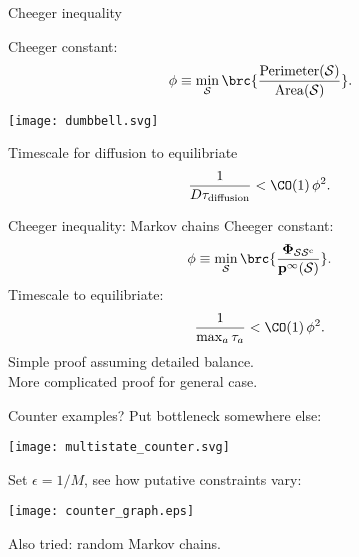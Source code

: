 \documentclass{beamer}%
\newcommand{\pr}{\mathbf{p}}
\newcommand{\eq}{\pr^\infty}
\newcommand{\F}{\boldsymbol{\Phi}}
\newcommand{\CS}{\mathcal{S}}
\newcommand{\comp}{^\mathrm{c}}
\begin{document}

\begin{frame}{Cheeger inequality}
%
 \parbox{5cm}{
 Cheeger constant:
 \begin{equation*}
   \phi \equiv \min_\CS \brc{\frac{\operatorname{Perimeter}(\CS)}{\operatorname{Area}(\CS)}}.
 \end{equation*}
 }
 \parbox{6cm}{
   \texttt{[image: dumbbell.svg]}
 }
 Timescale for diffusion to equilibriate
 \begin{equation*}
   \frac{1}{D \tau_{\text{diffusion}}} < \CO(1)\, \phi^2.
 \end{equation*}
%
\end{frame}


\begin{frame}{Cheeger inequality: Markov chains}
%
 Cheeger constant:
 \begin{equation*}
   \phi \equiv \min_\CS \brc{\frac{\F_{\CS\CS\comp}}{\eq(\CS)}}.
 \end{equation*}
 Timescale to equilibriate:
 \begin{equation*}
   \frac{1}{\max_a\tau_a} < \CO(1)\, \phi^2.
 \end{equation*}
 Simple proof assuming detailed balance. \\
 More complicated proof for general case. 
%
\end{frame}


\begin{frame}{Counter examples?}
%
 Put bottleneck somewhere else:
 \begin{center}
   \texttt{[image: multistate\_counter.svg]}
 \end{center}
 Set $\epsilon = 1/M$, see how putative constraints vary:
 \begin{center}
   \texttt{[image: counter\_graph.eps]}
 \end{center}
 
 Also tried: random Markov chains.
%
\end{frame}
\end{document}
